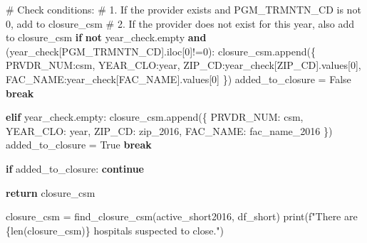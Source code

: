 \documentclass[
  letterpaper,
  DIV=11,
  numbers=noendperiod]{scrartcl}
\newenvironment{Shaded}{\begin{snugshade}}{\end{snugshade}}
\newcommand{\BuiltInTok}[1]{\textcolor[rgb]{0.00,0.23,0.31}{#1}}
\newcommand{\CommentTok}[1]{\textcolor[rgb]{0.37,0.37,0.37}{#1}}
\newcommand{\ControlFlowTok}[1]{\textcolor[rgb]{0.00,0.23,0.31}{\textbf{#1}}}
\newcommand{\DecValTok}[1]{\textcolor[rgb]{0.68,0.00,0.00}{#1}}
\newcommand{\KeywordTok}[1]{\textcolor[rgb]{0.00,0.23,0.31}{\textbf{#1}}}
\newcommand{\NormalTok}[1]{\textcolor[rgb]{0.00,0.23,0.31}{#1}}
\newcommand{\OperatorTok}[1]{\textcolor[rgb]{0.37,0.37,0.37}{#1}}
\newcommand{\SpecialCharTok}[1]{\textcolor[rgb]{0.37,0.37,0.37}{#1}}
\newcommand{\SpecialStringTok}[1]{\textcolor[rgb]{0.13,0.47,0.30}{#1}}
\newcommand{\StringTok}[1]{\textcolor[rgb]{0.13,0.47,0.30}{#1}}
\newcommand{\VariableTok}[1]{\textcolor[rgb]{0.07,0.07,0.07}{#1}}
\begin{document}
\begin{Shaded}
\begin{Highlighting}[]
      \CommentTok{\# Check conditions:}
      \CommentTok{\# 1. If the provider exists and PGM\_TRMNTN\_CD is not 0, add to closure\_csm}
      \CommentTok{\# 2. If the provider does not exist for this year, also add to closure\_csm}
      \ControlFlowTok{if} \KeywordTok{not}\NormalTok{ year\_check.empty }\KeywordTok{and}\NormalTok{ (year\_check[}\StringTok{\textquotesingle{}PGM\_TRMNTN\_CD\textquotesingle{}}\NormalTok{].iloc[}\DecValTok{0}\NormalTok{]}\OperatorTok{!=}\DecValTok{0}\NormalTok{):}
\NormalTok{        closure\_csm.append(\{}
          \StringTok{\textquotesingle{}PRVDR\_NUM\textquotesingle{}}\NormalTok{:csm,}
          \StringTok{\textquotesingle{}YEAR\_CLO\textquotesingle{}}\NormalTok{:year,}
          \StringTok{\textquotesingle{}ZIP\_CD\textquotesingle{}}\NormalTok{:year\_check[}\StringTok{\textquotesingle{}ZIP\_CD\textquotesingle{}}\NormalTok{].values[}\DecValTok{0}\NormalTok{],}
          \StringTok{\textquotesingle{}FAC\_NAME\textquotesingle{}}\NormalTok{:year\_check[}\StringTok{\textquotesingle{}FAC\_NAME\textquotesingle{}}\NormalTok{].values[}\DecValTok{0}\NormalTok{]}
\NormalTok{        \})}
\NormalTok{        added\_to\_closure }\OperatorTok{=} \VariableTok{False}
        \ControlFlowTok{break}

      \ControlFlowTok{elif}\NormalTok{ year\_check.empty:}
\NormalTok{        closure\_csm.append(\{}
            \StringTok{\textquotesingle{}PRVDR\_NUM\textquotesingle{}}\NormalTok{: csm,}
            \StringTok{\textquotesingle{}YEAR\_CLO\textquotesingle{}}\NormalTok{: year,}
            \StringTok{\textquotesingle{}ZIP\_CD\textquotesingle{}}\NormalTok{: zip\_2016,}
            \StringTok{\textquotesingle{}FAC\_NAME\textquotesingle{}}\NormalTok{: fac\_name\_2016}
\NormalTok{        \})}
\NormalTok{        added\_to\_closure }\OperatorTok{=} \VariableTok{True}
        \ControlFlowTok{break}

      \ControlFlowTok{if}\NormalTok{ added\_to\_closure:}
        \ControlFlowTok{continue}

  \ControlFlowTok{return}\NormalTok{ closure\_csm}

\NormalTok{closure\_csm }\OperatorTok{=}\NormalTok{ find\_closure\_csm(active\_short2016, df\_short)}
\BuiltInTok{print}\NormalTok{(}\SpecialStringTok{f"There are }\SpecialCharTok{\{}\BuiltInTok{len}\NormalTok{(closure\_csm)}\SpecialCharTok{\}}\SpecialStringTok{ hospitals suspected to close."}\NormalTok{)}
\end{Highlighting}
\end{Shaded}
\end{document}
